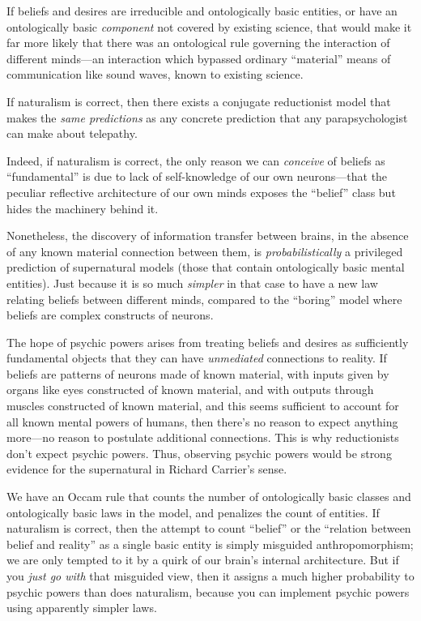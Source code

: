 {
 If beliefs and desires are irreducible and ontologically basic
entities, or have an ontologically basic \textit{component} not covered
by existing science, that would make it far more likely that there was
an ontological rule governing the interaction of different minds---an
interaction which bypassed ordinary
``material'' means of communication
like sound waves, known to existing science.}

{
 If naturalism is correct, then there exists a conjugate
reductionist model that makes the \textit{same predictions} as any
concrete prediction that any parapsychologist can make about
telepathy.}

{
 Indeed, if naturalism is correct, the only reason we can
\textit{conceive} of beliefs as
``fundamental'' is due to lack of
self-knowledge of our own neurons---that the peculiar reflective
architecture of our own minds exposes the
``belief'' class but hides the
machinery behind it.}

{
 Nonetheless, the discovery of information transfer between brains,
in the absence of any known material connection between them, is
\textit{probabilistically} a privileged prediction of supernatural
models (those that contain ontologically basic mental entities). Just
because it is so much \textit{simpler} in that case to have a new law
relating beliefs between different minds, compared to the
``boring'' model where beliefs are
complex constructs of neurons.}

{
 The hope of psychic powers arises from treating beliefs and
desires as sufficiently fundamental objects that they can have
\textit{unmediated} connections to reality. If beliefs are patterns of
neurons made of known material, with inputs given by organs like eyes
constructed of known material, and with outputs through muscles
constructed of known material, and this seems sufficient to account for
all known mental powers of humans, then there's no
reason to expect anything more---no reason to postulate additional
connections. This is why reductionists don't expect
psychic powers. Thus, observing psychic powers would be strong evidence
for the supernatural in Richard Carrier's sense.}

{
 We have an Occam rule that counts the number of ontologically
basic classes and ontologically basic laws in the model, and penalizes
the count of entities. If naturalism is correct, then the attempt to
count ``belief'' or the
``relation between belief and
reality'' as a single basic entity is simply
misguided anthropomorphism; we are only tempted to it by a quirk of our
brain's internal architecture. But if you \textit{just
go with} that misguided view, then it assigns a much higher probability
to psychic powers than does naturalism, because you can implement
psychic powers using apparently simpler laws.}

